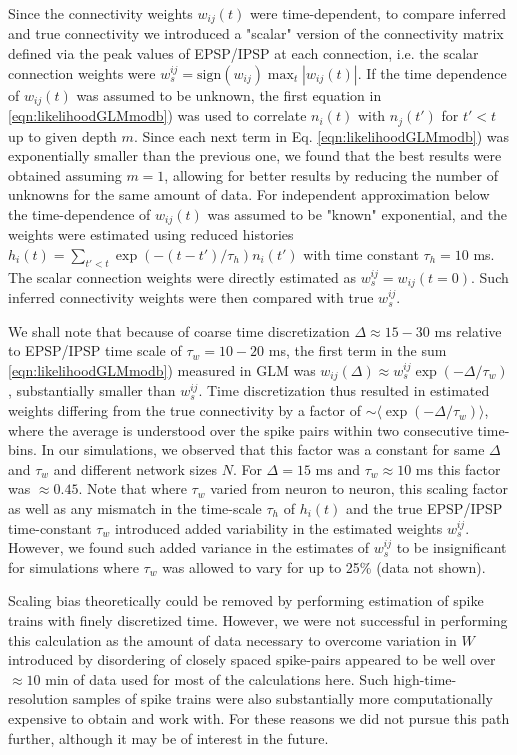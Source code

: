 Since the connectivity weights $w_{ij}(t)$ were time-dependent, to compare inferred and true connectivity we introduced a "scalar" version of the connectivity matrix defined via the peak values of EPSP/IPSP at each connection, i.e. the scalar connection weights were $w^{ij}_s=\text{sign}(w_{ij})\max_{t} |w_{ij}(t)|$.  If the time dependence of $w_{ij}(t)$ was assumed to be unknown, the first equation in \eqref{eqn:likelihoodGLMmodb}) was used to correlate $n_i(t)$ with $n_j(t')$ for $t'<t$ up to given depth $m$.  Since each next term in Eq. \eqref{eqn:likelihoodGLMmodb}) was exponentially smaller than the previous one, we found that the best results were obtained assuming $m=1$, allowing for better results by reducing the number of unknowns for the same amount of data.  For independent approximation below the time-dependence of $w_{ij}(t)$ was assumed to be "known" exponential, and the weights were estimated using reduced histories $h_{i}(t)=\sum_{t'<t} \exp(-(t-t')/\tau_h)n_{i}(t')$ with time constant $\tau_h=10$ ms. The scalar connection weights were directly estimated as $w^{ij}_s=w_{ij}(t=0)$.  Such inferred connectivity weights were then compared with true $w^{ij}_s$.

We shall note that because of coarse time discretization $\Delta \approx 15-30$ ms relative to EPSP/IPSP time scale of $\tau_w = 10-20$ ms, the first term in the sum \eqref{eqn:likelihoodGLMmodb}) measured in GLM was $w_{ij}(\Delta)\approx w^{ij}_s\exp(-\Delta/\tau_w)$, substantially smaller than $w^{ij}_s$. Time discretization thus resulted in estimated weights differing from the true connectivity by a factor of $\sim \langle \exp(-\Delta/\tau_w) \rangle$, where the average is understood over the spike pairs within two consecutive time-bins. In our simulations, we observed that this factor was a constant for same $\Delta$ and $\tau_w$ and different network sizes $N$. For $\Delta=15$ ms and $\tau_w\approx 10$ ms this factor was  $\approx 0.45$.  Note that where $\tau_w$ varied from neuron to neuron, this scaling factor as well as any mismatch in the time-scale $\tau_h$ of $h_i(t)$ and the true EPSP/IPSP time-constant $\tau_w$ introduced added variability in the estimated weights $w^{ij}_s$. However, we found such added variance in the estimates of $w^{ij}_s$ to be insignificant for simulations where $\tau_w$ was allowed to vary for up to 25\% (data not shown).

Scaling bias theoretically could be removed by performing estimation of spike trains with finely discretized time. However, we were not successful in performing this calculation as the amount of data necessary to overcome variation in $W$ introduced by disordering of closely spaced spike-pairs appeared to be well over $\approx 10$ min of data used for most of the calculations here. Such high-time-resolution samples of spike trains were also substantially more computationally expensive to obtain and work with. For these reasons we did not pursue this path further, although it may be of interest in the future.

